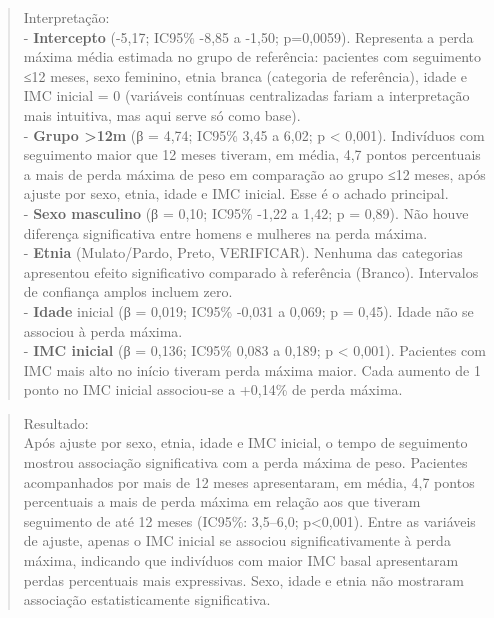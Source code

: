 \documentclass[
]{article}
\begin{document}
\begin{quote}
Interpretação:\\
- \textbf{Intercepto} (-5,17; IC95\% -8,85 a -1,50; p=0,0059).
Representa a perda máxima média estimada no grupo de referência:
pacientes com seguimento ≤12 meses, sexo feminino, etnia branca
(categoria de referência), idade e IMC inicial = 0 (variáveis contínuas
centralizadas fariam a interpretação mais intuitiva, mas aqui serve só
como base).\\
- \textbf{Grupo \textgreater12m} (β = 4,74; IC95\% 3,45 a 6,02; p
\textless{} 0,001). Indivíduos com seguimento maior que 12 meses
tiveram, em média, 4,7 pontos percentuais a mais de perda máxima de peso
em comparação ao grupo ≤12 meses, após ajuste por sexo, etnia, idade e
IMC inicial. Esse é o achado principal.\\
- \textbf{Sexo masculino} (β = 0,10; IC95\% -1,22 a 1,42; p = 0,89). Não
houve diferença significativa entre homens e mulheres na perda máxima.\\
- \textbf{Etnia} (Mulato/Pardo, Preto, VERIFICAR). Nenhuma das
categorias apresentou efeito significativo comparado à referência
(Branco). Intervalos de confiança amplos incluem zero.\\
- \textbf{Idade} inicial (β = 0,019; IC95\% -0,031 a 0,069; p = 0,45).
Idade não se associou à perda máxima.\\
- \textbf{IMC inicial} (β = 0,136; IC95\% 0,083 a 0,189; p \textless{}
0,001). Pacientes com IMC mais alto no início tiveram perda máxima
maior. Cada aumento de 1 ponto no IMC inicial associou-se a +0,14\% de
perda máxima.
\end{quote}

\begin{quote}
Resultado:\\
Após ajuste por sexo, etnia, idade e IMC inicial, o tempo de seguimento
mostrou associação significativa com a perda máxima de peso. Pacientes
acompanhados por mais de 12 meses apresentaram, em média, 4,7 pontos
percentuais a mais de perda máxima em relação aos que tiveram seguimento
de até 12 meses (IC95\%: 3,5--6,0; p\textless0,001). Entre as variáveis
de ajuste, apenas o IMC inicial se associou significativamente à perda
máxima, indicando que indivíduos com maior IMC basal apresentaram perdas
percentuais mais expressivas. Sexo, idade e etnia não mostraram
associação estatisticamente significativa.\\
\end{quote}
\end{document}
